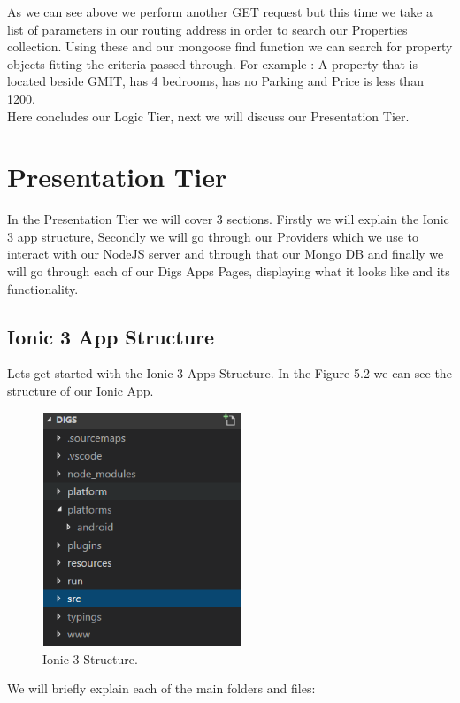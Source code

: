 As we can see above we perform another GET request but this time we take a list of parameters in our routing address in order to search our Properties collection. Using these and our mongoose find function we can search for property objects fitting the criteria passed through. For example : A property that is located beside GMIT, has 4 bedrooms, has no Parking and Price is less than 1200.\\

Here concludes our Logic Tier, next we will discuss our Presentation Tier.

\section{Presentation Tier}

In the Presentation Tier we will cover 3 sections. Firstly we will explain the Ionic 3 app structure, Secondly we will go through our Providers which we use to interact with our NodeJS server and through that our Mongo DB and finally we will go through each of our Digs Apps Pages, displaying what it looks like and its functionality.\\

\subsection{Ionic 3 App Structure}

\noindent Lets get started with the Ionic 3 Apps Structure. In the Figure 5.2 we can see the structure of our Ionic App.

\begin{figure}[h]
\centering
\includegraphics[width=6cm, height=7cm]{img/IonicStructure}
\caption{Ionic 3 Structure.}
\end{figure}


\noindent We will briefly explain each of the main folders and files:

